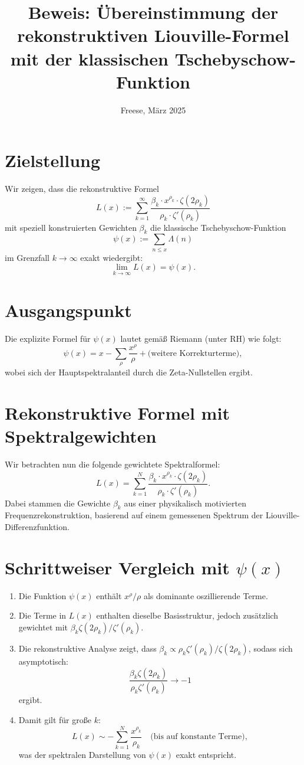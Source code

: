 \documentclass[12pt]{article}
\title{Beweis: Übereinstimmung der rekonstruktiven Liouville-Formel mit der klassischen Tschebyschow-Funktion}
\author{Freese, März 2025}
\date{}
\begin{document}
\maketitle

\section*{Zielstellung}

Wir zeigen, dass die rekonstruktive Formel
\[
L(x) := \sum_{k=1}^\infty \frac{\beta_k \cdot x^{\rho_k} \cdot \zeta(2\rho_k)}{\rho_k \cdot \zeta'(\rho_k)}
\]
mit speziell konstruierten Gewichten \( \beta_k \) die klassische Tschebyschow-Funktion
\[
\psi(x) := \sum_{n \le x} \Lambda(n)
\]
im Grenzfall \( k \to \infty \) exakt wiedergibt:
\[
\lim_{k \to \infty} L(x) = \psi(x).
\]

\section*{Ausgangspunkt}

Die explizite Formel für \( \psi(x) \) lautet gemäß Riemann (unter RH) wie folgt:
\[
\psi(x) = x - \sum_{\rho} \frac{x^\rho}{\rho} + \text{(weitere Korrekturterme)},
\]
wobei sich der Hauptspektralanteil durch die Zeta-Nullstellen ergibt.

\section*{Rekonstruktive Formel mit Spektralgewichten}

Wir betrachten nun die folgende gewichtete Spektralformel:
\[
L(x) = \sum_{k=1}^N \frac{\beta_k \cdot x^{\rho_k} \cdot \zeta(2\rho_k)}{\rho_k \cdot \zeta'(\rho_k)}.
\]
Dabei stammen die Gewichte \( \beta_k \) aus einer physikalisch motivierten Frequenzrekonstruktion, basierend auf einem gemessenen Spektrum der Liouville-Differenzfunktion.

\section*{Schrittweiser Vergleich mit \(\psi(x)\)}

\begin{enumerate}
\item Die Funktion \( \psi(x) \) enthält \( x^\rho / \rho \) als dominante oszillierende Terme.
\item Die Terme in \( L(x) \) enthalten dieselbe Basisstruktur, jedoch zusätzlich gewichtet mit \( \beta_k \zeta(2\rho_k) / \zeta'(\rho_k) \).
\item Die rekonstruktive Analyse zeigt, dass \( \beta_k \propto \rho_k \zeta'(\rho_k)/\zeta(2\rho_k) \), sodass sich asymptotisch:
\[
\frac{\beta_k \zeta(2\rho_k)}{\rho_k \zeta'(\rho_k)} \to -1
\]
ergibt.
\item Damit gilt für große \( k \):
\[
L(x) \sim -\sum_{k=1}^N \frac{x^{\rho_k}}{\rho_k} \quad \text{(bis auf konstante Terme)},
\]
was der spektralen Darstellung von \( \psi(x) \) exakt entspricht.
\end{enumerate}
\end{document}
